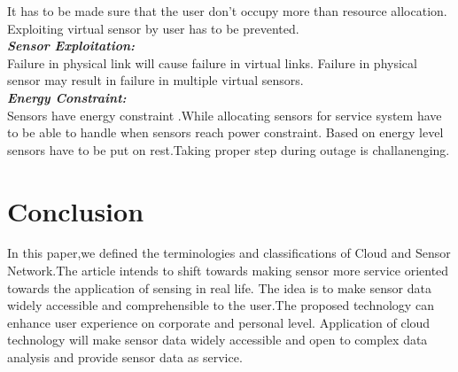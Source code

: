 \documentclass {report}
\begin{document}
 It has to be made sure that the user don’t occupy more than resource allocation. Exploiting virtual sensor by user has to be prevented. \\

{\bfseries \emph{Sensor Exploitation:}\\}
Failure in physical link will cause failure in virtual links. Failure in physical sensor may result in failure in multiple virtual sensors.\\

{\bfseries \emph{Energy Constraint:}\\}
 Sensors have energy constraint .While allocating sensors for service system have to be able to handle when sensors reach power constraint. Based on energy level sensors have to be put on rest.Taking proper step during outage is challanenging.\\



\chapter{Conclusion}
In this paper,we defined the terminologies and classifications of Cloud and Sensor Network.The article intends to shift towards making sensor more service oriented towards the application of sensing in real life.
The idea is to make sensor data widely accessible  and comprehensible to the user.The proposed technology can enhance user experience on corporate and personal level.
Application of cloud technology will make sensor data widely accessible and open to complex data analysis and provide sensor data as service.
\end{document}
